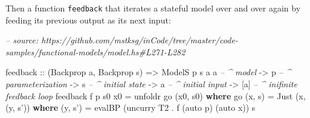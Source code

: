\documentclass[]{article}
\newenvironment{Shaded}{}{}
\newcommand{\CommentTok}[1]{\textcolor[rgb]{0.38,0.63,0.69}{\textit{#1}}}
\newcommand{\DataTypeTok}[1]{\textcolor[rgb]{0.56,0.13,0.00}{#1}}
\newcommand{\FunctionTok}[1]{\textcolor[rgb]{0.02,0.16,0.49}{#1}}
\newcommand{\KeywordTok}[1]{\textcolor[rgb]{0.00,0.44,0.13}{\textbf{#1}}}
\newcommand{\NormalTok}[1]{#1}
\newcommand{\OtherTok}[1]{\textcolor[rgb]{0.00,0.44,0.13}{#1}}
\begin{document}
\begin{Shaded}
\end{Shaded}

Then a function \texttt{feedback} that iterates a stateful model over and over
again by feeding its previous output as its next input:

\begin{Shaded}
\begin{Highlighting}[]
\CommentTok{-- source: https://github.com/mstksg/inCode/tree/master/code-samples/functional-models/model.hs#L271-L282}

\NormalTok{feedback}
\OtherTok{    ::}\NormalTok{ (}\DataTypeTok{Backprop}\NormalTok{ a, }\DataTypeTok{Backprop}\NormalTok{ s)}
    \OtherTok{=>} \DataTypeTok{ModelS}\NormalTok{ p s a a     }\CommentTok{-- ^ model}
    \OtherTok{->}\NormalTok{ p                  }\CommentTok{-- ^ parameterization}
    \OtherTok{->}\NormalTok{ s                  }\CommentTok{-- ^ initial state}
    \OtherTok{->}\NormalTok{ a                  }\CommentTok{-- ^ initial input}
    \OtherTok{->}\NormalTok{ [a]                }\CommentTok{-- ^ inifinite feedback loop}
\NormalTok{feedback f p s0 x0 }\FunctionTok{=}\NormalTok{ unfoldr go (x0, s0)}
  \KeywordTok{where}
\NormalTok{    go (x, s) }\FunctionTok{=} \DataTypeTok{Just}\NormalTok{ (x, (y, s'))}
      \KeywordTok{where}
\NormalTok{        (y, s') }\FunctionTok{=}\NormalTok{ evalBP (uncurry }\DataTypeTok{T2} \FunctionTok{.}\NormalTok{ f (auto p) (auto x)) s}
\end{Highlighting}
\end{Shaded}
\end{document}
